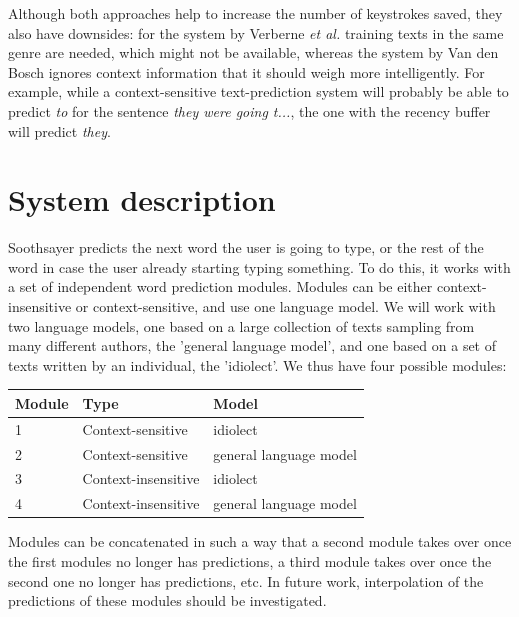\documentclass[11pt]{article}
\let\originaltable\table
\let\endoriginaltable\endtable
\renewenvironment{table}[1][ht]{%
  \originaltable[#1]
  \centering}%
  {\endoriginaltable}
\begin{document}
Although both approaches help to increase the number of keystrokes saved, they also have downsides: for the system by Verberne {\em et al.}  training texts in the same genre are needed, which might not be available, whereas the system by Van den Bosch  ignores context information that it should weigh more intelligently. For example, while a context-sensitive text-prediction system will probably be able to predict \emph{to} for the sentence \emph{they were going t...}, the one with the recency buffer will predict \emph{they}.


\section{System description} \label{algorithm}

Soothsayer predicts the next word the user is going to type, or the rest of the word in case the user already starting typing something. To do this, it works with a set of independent word prediction modules. Modules can be either context-insensitive or context-sensitive, and use one language model. We will work with two language models, one based on a large collection of texts sampling from many different authors, the 'general language model', and one based on a set of texts written by an individual, the 'idiolect'. We thus have four possible modules:

\begin{table}[htb]
\begin{tabular}{lll} 
Module&Type&Model\\
\hline
1& {\footnotesize Context-sensitive} & {\footnotesize idiolect}\\
2& {\footnotesize Context-sensitive} & {\footnotesize general language model} \\
3& {\footnotesize Context-insensitive} & {\footnotesize idiolect}\\ 
4& {\footnotesize Context-insensitive} & {\footnotesize general language model} \\
\end{tabular} 
\caption{Four possible modules: combinations of type and language model}
\end{table}

Modules can be concatenated in such a way that a second module takes over once the first modules no longer has predictions, a third module takes over once the second one no longer has predictions, etc. In future work, interpolation of the predictions of these modules should be investigated.
\end{document}
